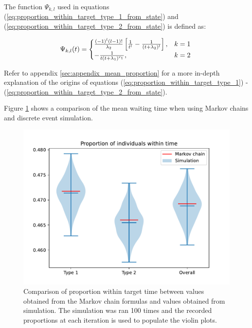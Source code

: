 The function \(\Psi_{k,l}\) used in equations 
(\ref{eq:proportion_within_target_type_1_from_state}) and 
(\ref{eq:proportion_within_target_type_2_from_state}) is defined as:

\begin{equation}
    \Psi_{k,l}(t) = 
    \begin{cases} 
        \frac{(-1)^{l} (l-1)!}{\lambda_2} \left[\frac{1}{t^l} - \frac{1}
        {(t + \lambda_2)^l}\right] , & k=1 \\
        - \frac{1}{t (t + \lambda_1)^{r_1}}, & k=2
    \end{cases} \nonumber \\
\end{equation}

Refer to appendix \ref{sec:appendix_mean_proportion} for a more in-depth 
explanation of the origins of equations 
(\ref{eq:proportion_within_target_type_1}) - 
(\ref{eq:proportion_within_target_type_2_from_state}).


Figure \ref{fig:markov_vs_des_proportion_comparison} shows a comparison of the
mean waiting time when using Markov chains and discrete event simulation.

\begin{figure}[ht]
    \centering
    \includegraphics[width=\textwidth]{imgs/markov_vs_des/proportion_within_time/main.pdf}
    \caption{
        Comparison of proportion within target time between values obtained 
        from the Markov chain formulas and values obtained from simulation. 
        The simulation was ran 100 times and the recorded proportions at each
        iteration is used to populate the violin plots.
    }
    \label{fig:markov_vs_des_proportion_comparison}
\end{figure}
 
